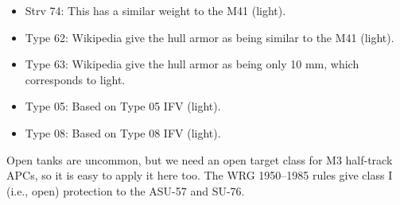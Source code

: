{{\begin{itemize}
            \item Strv 74: This has a similar weight to the M41 (light).
            \item Type 62: Wikipedia give the hull armor as being similar to the M41 (light).
            \item Type 63: Wikipedia give the hull armor as being only 10 mm, which corresponds to light.
            \item Type 05: Based on Type 05 IFV (light).
            \item Type 08: Based on Type 08 IFV (light).
        \end{itemize}
        Open tanks are uncommon, but we need an open target class for M3 half-track APCs, so it is easy to apply it here too. The WRG 1950--1985 rules give class I (i.e., open) protection to the
        ASU-57 and
        SU-76.
    }




}

